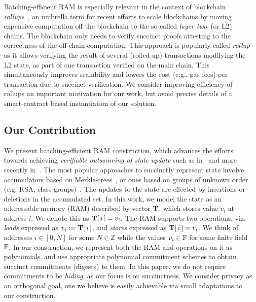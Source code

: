  Batching-efficient RAM is especially relevant in the context of blockchain {\em rollups}~\cite{rollup},
an umbrella term for recent efforts to scale blockchains by moving expensive computation off the blockchain to the so-called {\em layer two}~(or L2) chains. The blockchain only needs to verify succinct proofs attesting to the correctness of the off-chain computation. This approach is popularly called \textit{rollup} as it allows verifying the result of several (rolled-up) transactions modifying the L2 state, as part of one transaction verified on the main chain.
This simultaneously improves scalability and lowers the cost (e.g., gas fees) per transaction due to succinct verification. We consider improving efficiency of rollups an important motivation for our work, but avoid precise details of a smart-contract based
instantiation of our solution.

\subsection{Our Contribution}\label{subsec:ourwork} 
We present batching-efficient RAM construction, which advances the efforts
towards achieving {\em verifiable outsourcing of state update} such as in~\cite{EPRINT:BFRSBW13}
and more recently in~\cite{USENIX:OWWB20,CCS:CFHKKO22}.
The most popular approaches to succinctly represent
state involve accumulators based on Merkle-trees~\cite{C:Merkle87}, or ones based on groups of unknown order
(e.g. RSA, class-groups)~\cite{C:CamLys02,C:BonBunFis19,USENIX:OWWB20,CCS:CFHKKO22}.
The updates to the state are effected by insertions or deletions in the  accumulated set.
In this work, we
model the state as an addressable memory (RAM) described by vector $\mathbf{T}$, which stores value $v_i$ at address $i$.
We denote this as $\mathbf{T}[\,i\,]=v_i$. The RAM supports two operations, viz, {\em loads} expressed
as $v_i := \mathbf{T}[\,i\,]$, and {\em stores} expressed as $\mathbf{T}[\,i\,]=v_i$.
We think of addresses $i\in [0,N]$ for some $N\in \mathbb{Z}$ while the
values $v_i\in \mathbb{F}$ for some finite field $\mathbb{F}$. In our construction, we represent both the RAM and operations on it
as polynomials, and use appropriate polynomial commitment schemes to obtain succinct commitments (digests) to them.
In this paper, we do not require commitments to be {\em hiding}, as our focus is on succinctness.
We consider privacy as an orthogonal goal, one we believe is easily achievable
via small adaptations to our construction.\smallskip


